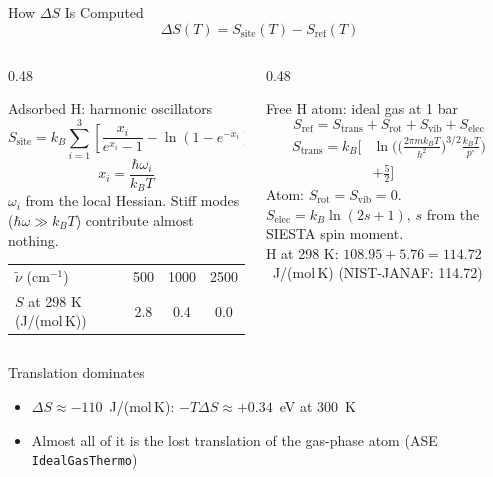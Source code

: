 \documentclass[8pt]{beamer}
\begin{document}
\begin{frame}{How $\Delta S$ Is Computed}
	\[
		\Delta S(T) = S_{\text{site}}(T) - S_{\text{ref}}(T)
	\]
	\begin{columns}[T]
		\begin{column}{0.48\textwidth}
			\begin{block}{Adsorbed H: harmonic oscillators}
				\[
					S_{\text{site}} = k_B \sum_{i=1}^{3}
					\left[\frac{x_i}{e^{x_i}-1} - \ln\!\left(1-e^{-x_i}\right)\right]
				\]
				\[
					x_i = \frac{\hbar\omega_i}{k_B T}
				\]
				{\scriptsize $\omega_i$ from the local Hessian. Stiff modes ($\hbar\omega \gg k_BT$)
				contribute almost nothing.}\\[4pt]
				{\scriptsize
				\begin{tabular}{lccc}
					\toprule
					$\tilde\nu$ (cm$^{-1}$) & 500 & 1000 & 2500 \\
					$S$ at 298 K (J/(mol\,K)) & 2.8 & 0.4 & 0.0 \\
					\bottomrule
				\end{tabular}}
			\end{block}
		\end{column}
		\begin{column}{0.48\textwidth}
			\begin{block}{Free H atom: ideal gas at 1 bar}
				\[
					S_{\text{ref}} = S_{\text{trans}} + S_{\text{rot}} + S_{\text{vib}} + S_{\text{elec}}
				\]
				\[
					\begin{aligned}
					S_{\text{trans}} = k_B\Big[&\ln\!\Big(\big(\tfrac{2\pi m k_B T}{h^2}\big)^{3/2}
					\tfrac{k_B T}{p^\circ}\Big)\\
					&+ \tfrac{5}{2}\Big]
					\end{aligned}
				\]
				{\scriptsize Atom: $S_{\text{rot}} = S_{\text{vib}} = 0$.
				$S_{\text{elec}} = k_B\ln(2s+1)$, $s$ from the SIESTA spin moment.}\\[4pt]
				{\scriptsize H at 298 K: $108.95 + 5.76 = \mathbf{114.72}$~J/(mol\,K)
				(NIST-JANAF: 114.72)}
			\end{block}
		\end{column}
	\end{columns}
	\vspace{0.15cm}
	\begin{alertblock}{Translation dominates}
		\small
		\begin{itemize}
			\item $\Delta S \approx -110$~J/(mol\,K): $-T\Delta S \approx +0.34$~eV at 300~K
			\item Almost all of it is the lost translation of the gas-phase atom (ASE \texttt{IdealGasThermo})
		\end{itemize}
	\end{alertblock}
\end{frame}
\end{document}
